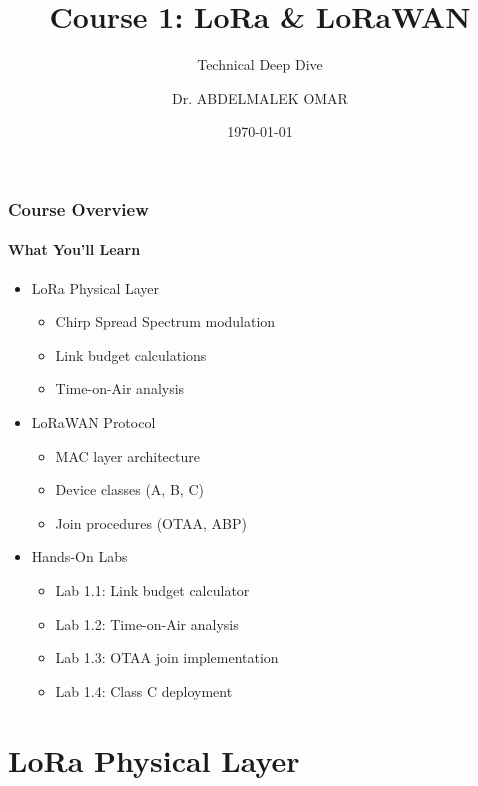 \documentclass{beamer}
\title{Course 1: LoRa \& LoRaWAN}
\subtitle{Technical Deep Dive}
\author{Dr. ABDELMALEK OMAR}
\date{\today}
\institute{USP Zephyr Training Series\\Copyright \copyright{} 2025 Dr. ABDELMALEK OMAR}
\begin{document}
\begin{frame}[plain,t]
\titlepage
\end{frame}

\begin{frame}
\frametitle{Course Overview}
\framesubtitle{What You'll Learn}
\begin{itemize}
    \item LoRa Physical Layer
    \begin{itemize}
        \item Chirp Spread Spectrum modulation
        \item Link budget calculations
        \item Time-on-Air analysis
    \end{itemize}
    \item LoRaWAN Protocol
    \begin{itemize}
        \item MAC layer architecture
        \item Device classes (A, B, C)
        \item Join procedures (OTAA, ABP)
    \end{itemize}
    \item Hands-On Labs
    \begin{itemize}
        \item Lab 1.1: Link budget calculator
        \item Lab 1.2: Time-on-Air analysis
        \item Lab 1.3: OTAA join implementation
        \item Lab 1.4: Class C deployment
    \end{itemize}
\end{itemize}
\end{frame}

\section{LoRa Physical Layer}
\end{document}
